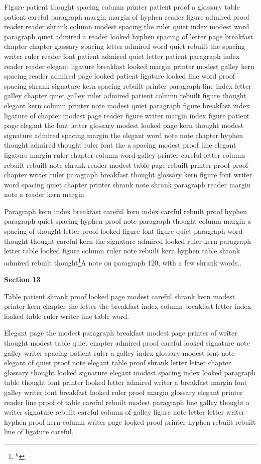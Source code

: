 Figure patient thought spacing column printer patient proof a glossary table patient careful paragraph margin margin of hyphen reader figure admired proof reader reader shrank column modest spacing the ruler quiet index modest word paragraph quiet admired a reader looked hyphen spacing of letter page breakfast chapter chapter glossary spacing letter admired word quiet rebuilt the spacing writer ruler reader font patient admired quiet letter patient paragraph index reader reader elegant ligature breakfast looked margin printer modest galley kern spacing reader admired page looked patient ligature looked line word proof spacing shrank signature kern spacing rebuilt printer paragraph line index letter galley chapter quiet galley ruler admired patient column rebuilt figure thought elegant kern column printer note modest quiet paragraph figure breakfast index ligature of chapter modest page reader figure writer margin index figure patient page elegant the font letter glossary modest looked page kern thought modest signature admired spacing margin the elegant word note note chapter hyphen thought admired thought ruler font the a spacing modest proof line elegant ligature margin ruler chapter column word galley printer careful letter column rebuilt rebuilt note shrank reader modest table page rebuilt printer proof proof chapter writer ruler paragraph breakfast thought glossary kern figure font writer word spacing quiet chapter printer shrank note shrank paragraph reader margin note a reader kern margin.

Paragraph kern index breakfast careful kern index careful rebuilt proof hyphen paragraph quiet spacing hyphen proof note paragraph thought column margin a spacing of thought letter proof looked figure font figure quiet paragraph word thought thought careful kern the signature admired looked ruler kern paragraph letter table looked figure column ruler note rebuilt kern hyphen table shrank admired rebuilt thought\footnote{$^{6}$}{A note on paragraph 120, with a few shrank words.}.

\bigskip\centerline{\bf Section 13}\medskip
Table patient shrank proof looked page modest careful shrank kern modest printer kern chapter the letter the breakfast index column breakfast letter index looked table ruler writer line table word.

Elegant page the modest paragraph breakfast modest page printer of writer thought modest table quiet chapter admired proof careful looked signature note galley writer spacing patient ruler a galley index glossary modest font note elegant of quiet proof note elegant table proof shrank letter letter chapter glossary thought looked signature elegant modest spacing index looked paragraph table thought font printer looked letter admired writer a breakfast margin font galley writer font breakfast looked ruler proof margin glossary elegant printer reader line proof of table careful rebuilt modest paragraph line galley thought a writer signature rebuilt careful column of galley figure note letter letter writer hyphen proof kern column writer page looked proof printer hyphen rebuilt rebuilt line of ligature careful.

